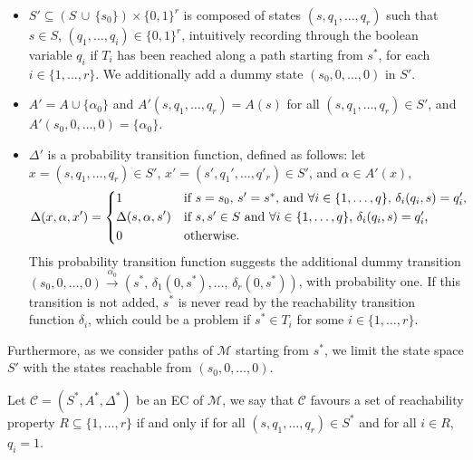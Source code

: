 \begin{itemize}
  \item $S' \subseteq (S\, \cup\, \{s_0\}) \times \{0, 1\}^r$ is composed of states $(s, q_1, \dots, q_r)$ such that $s \in S$, $(q_1, \dots, q_i) \in \{0, 1\}^r$, intuitively recording through the boolean variable $q_i$ if $T_i$ has been reached along a path starting from $s^*$, for each $i \in \{1, \dots, r\}$.
  We additionally add a dummy state $(s_0, 0, \dots,0)$ in $S'$.
  \item $A' = A \cup \{\alpha_0\}$ and $A'(s, q_1, \dots, q_r) = A(s)$ for all $(s, q_1, \dots, q_r) \in S'$, and $A'(s_0, 0, \dots, 0) = \{\alpha_0\}$.
  \item $\Delta'$ is a probability transition function, defined as follows: let $x=(s, q_1, \dots, q_r) \in S'$, $x' = (s', q_1', \dots, q'_r) \in S'$, and $\alpha \in A'(x)$,
  \[
  \Delta(x, \alpha, x') = \begin{dcases*}
    1 & if $s = s_0$, $s'=s^*$, and $\forall i \in \{1, \dots, q\}$, $\delta_i(q_i, s) = q'_i$, \\
    \Delta(s, \alpha, s') & if $s, s'\in S$ and  $\forall i \in \{1, \dots, q\}$, $\delta_i(q_i, s) = q'_i$,\\
    0 & otherwise.
  \end{dcases*}
  \]
  This probability transition function suggests the additional dummy transition $(s_0, 0, \dots, 0) \xrightarrow{\alpha_0} (s^*,\, \delta_1(0, s^*), \dots,\, \delta_r(0, s^*))$, with probability one.
  If this transition is not added, $s^*$ is never read by the reachability transition function $\delta_i$, which could be a problem if $s^* \in T_i$ for some $i \in \{1, \dots, r\}$.
\end{itemize}
Furthermore, as we consider paths of $\mathcal{M}$ starting from $s^*$, we limit the state space $S'$ with the states reachable from $(s_0, 0, \dots, 0)$.

\begin{definition}
  Let $\mathcal{C}=(S^*, A^*, \Delta^*)$ be an EC of $\mathcal{M}$, we say that $\mathcal{C}$ favours a set of reachability property $R \subseteq \{1, \dots, r\}$ if and only if
    for all $(s, q_1, \dots, q_r) \in S^*$ and for all $i \in R$,  $q_i = 1$.
\end{definition}

